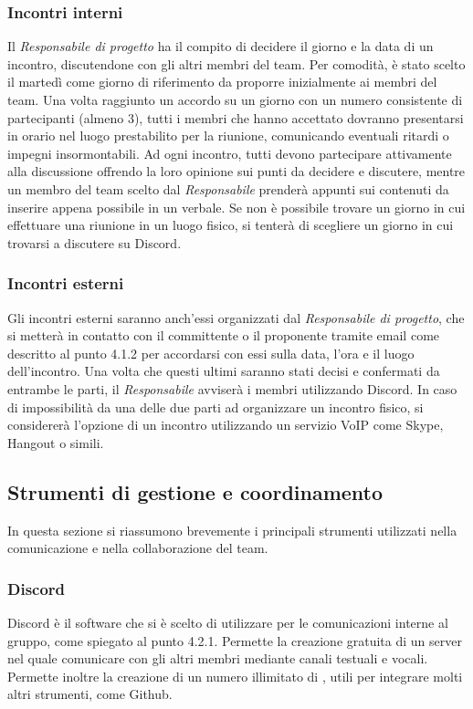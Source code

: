 \subsubsection{Incontri interni}
Il \emph{Responsabile di progetto} ha il compito di decidere il giorno e la data di un incontro, discutendone con gli altri membri del team. Per comodità, è stato scelto il martedì come giorno di riferimento da proporre inizialmente ai membri del team.
\newline
Una volta raggiunto un accordo su un giorno con un numero consistente di partecipanti (almeno 3), tutti i membri che hanno accettato dovranno presentarsi in orario nel luogo prestabilito per la riunione, comunicando eventuali ritardi o impegni insormontabili.
Ad ogni incontro, tutti devono partecipare attivamente alla discussione offrendo la loro opinione sui punti da decidere e discutere, mentre un membro del team scelto dal \emph{Responsabile} prenderà appunti sui contenuti da inserire appena possibile in un verbale.
\newline
Se non è possibile trovare un giorno in cui effettuare una riunione in un luogo fisico, si tenterà di scegliere un giorno in cui trovarsi a discutere su Discord.

\subsubsection{Incontri esterni}
Gli incontri esterni saranno anch'essi organizzati dal \emph{Responsabile di progetto}, che si metterà in contatto con il committente o il proponente tramite email come descritto al punto 4.1.2 per accordarsi con essi sulla data, l'ora e il luogo dell'incontro. Una volta che questi ultimi saranno stati decisi e confermati da entrambe le parti, il \emph{Responsabile} avviserà i membri utilizzando Discord.
In caso di impossibilità da una delle due parti ad organizzare un incontro fisico, si considererà l'opzione di un incontro utilizzando un servizio VoIP come Skype, Hangout o simili.

\subsection{Strumenti di gestione e coordinamento}
In questa sezione si riassumono brevemente i principali strumenti utilizzati nella comunicazione e nella collaborazione del team.

\subsubsection{Discord}
Discord è il software che si è scelto di utilizzare per le comunicazioni interne al gruppo, come spiegato al punto 4.2.1. Permette la creazione gratuita di un server nel quale comunicare con gli altri membri mediante canali testuali e vocali. Permette inoltre la creazione di un numero illimitato di , utili per integrare molti altri strumenti, come Github.

